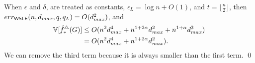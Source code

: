 When $\epsilon$ and $\delta$, are treated
as constants, $\epsilon_L = \log n + O(1)$, and $t = \lfloor\frac{n}{2}\rfloor$, then
$err_{\textsf{WSLE}}(n,d_{max},q,q_L) = O(d_{max}^2)$, and
\begin{align*}
  \operatorname{\mathbb{V}}[\hat{f}_*^\triangle(G)] 
  &\leq O(n^2 d_{max}^4 + n^{1+2\alpha} d_{max}^2 + n^{1+\alpha} d_{max}^3) \\
  &= O(n^2 d_{max}^4 + n^{1+2\alpha} d_{max}^2).
\end{align*}
We can remove the third term because it is always smaller than the first term.
\qed

